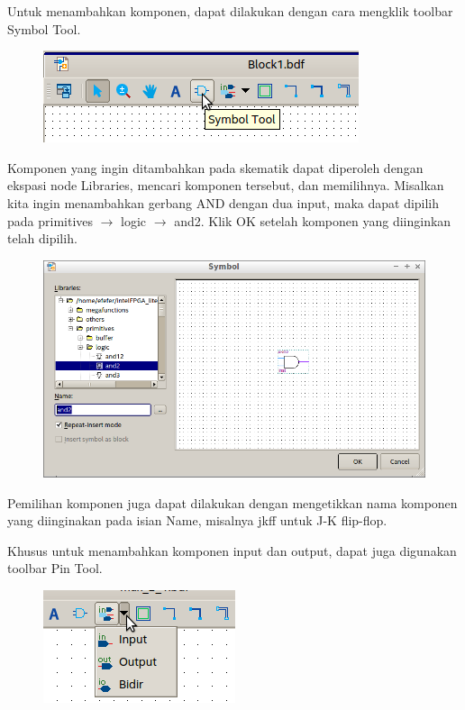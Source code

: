 Untuk menambahkan komponen, dapat dilakukan dengan cara mengklik toolbar
{\sf Symbol Tool}.

\begin{figure}[H]
\centering
\includegraphics[scale=0.5]{images/SymbolTool.png}
\par
\end{figure}

Komponen yang ingin ditambahkan pada skematik dapat diperoleh dengan
ekspasi node {\sf Libraries}, mencari komponen tersebut, dan memilihnya.
Misalkan kita ingin menambahkan gerbang AND dengan dua input, maka dapat dipilih
pada {\sf primitives $\rightarrow$ logic $\rightarrow$ and2}. Klik
{\sf OK} setelah komponen yang diinginkan telah dipilih.

\begin{figure}[H]
\centering
\includegraphics[scale=0.5]{images/BlockAnd.png}
\par
\end{figure}

Pemilihan komponen juga dapat dilakukan dengan mengetikkan nama komponen yang
diinginakan pada isian {\sf Name}, misalnya {\sf jkff} untuk J-K flip-flop.

Khusus untuk menambahkan komponen input dan output, dapat juga digunakan
toolbar {\sf Pin Tool}.
\begin{figure}[H]
\centering
\includegraphics[scale=0.5]{images/PinTool.png}
\par
\end{figure}

